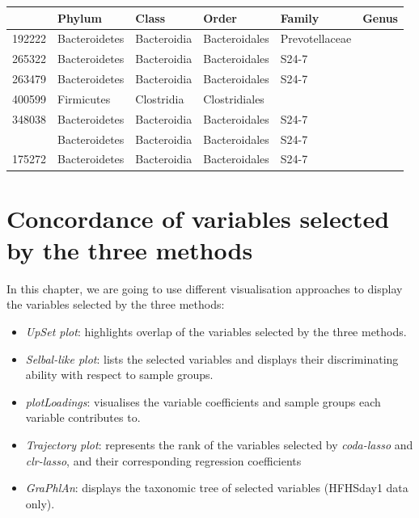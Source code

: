 \documentclass[openany]{book}
\newenvironment{Shaded}{\begin{snugshade}}{\end{snugshade}}
\newcommand{\KeywordTok}[1]{\textcolor[rgb]{0.13,0.29,0.53}{\textbf{#1}}}
\newcommand{\DataTypeTok}[1]{\textcolor[rgb]{0.13,0.29,0.53}{#1}}
\newcommand{\DecValTok}[1]{\textcolor[rgb]{0.00,0.00,0.81}{#1}}
\newcommand{\StringTok}[1]{\textcolor[rgb]{0.31,0.60,0.02}{#1}}
\newcommand{\OperatorTok}[1]{\textcolor[rgb]{0.81,0.36,0.00}{\textbf{#1}}}
\newcommand{\NormalTok}[1]{#1}
\providecommand{\tightlist}{%
  \setlength{\itemsep}{0pt}\setlength{\parskip}{0pt}}
\begin{document}
\begin{Shaded}
\end{Shaded}

\begin{tabular}{llllll}
\toprule
  & Phylum & Class & Order & Family & Genus\\
\midrule
192222 & Bacteroidetes & Bacteroidia & Bacteroidales & Prevotellaceae & \\
265322 & Bacteroidetes & Bacteroidia & Bacteroidales & S24-7 & \\
263479 & Bacteroidetes & Bacteroidia & Bacteroidales & S24-7 & \\
400599 & Firmicutes & Clostridia & Clostridiales &  & \\
348038 & Bacteroidetes & Bacteroidia & Bacteroidales & S24-7 & \\
\addlinespace
198339 & Bacteroidetes & Bacteroidia & Bacteroidales & S24-7 & \\
175272 & Bacteroidetes & Bacteroidia & Bacteroidales & S24-7 & \\
\bottomrule
\end{tabular}

\chapter{Concordance of variables selected by the three
methods}\label{comparison}

In this chapter, we are going to use different visualisation approaches
to display the variables selected by the three methods:

\begin{itemize}
\tightlist
\item
  \emph{UpSet plot}: highlights overlap of the variables selected by the
  three methods.
\item
  \emph{Selbal-like plot}: lists the selected variables and displays
  their discriminating ability with respect to sample groups.
\item
  \emph{plotLoadings}: visualises the variable coefficients and sample
  groups each variable contributes to.
\item
  \emph{Trajectory plot}: represents the rank of the variables selected
  by \emph{coda-lasso} and \emph{clr-lasso}, and their corresponding
  regression coefficients
\item
  \emph{GraPhlAn}: displays the taxonomic tree of selected variables
  (HFHSday1 data only).
\end{itemize}
\end{document}
